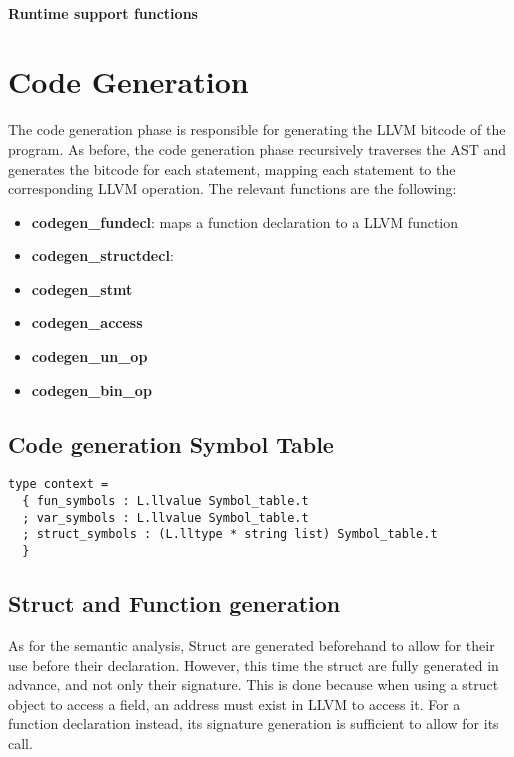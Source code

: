 \documentclass{article}
\begin{document}
\paragraph*{Runtime support functions}


\section{Code Generation}
The code generation phase is responsible for generating the LLVM bitcode of the program.
As before, the code generation phase recursively traverses the AST and generates the bitcode for each statement, mapping
each statement to the corresponding LLVM operation.
The relevant functions are the following:
\begin{itemize}
  \item \textbf{codegen\_fundecl}: maps a function declaration to a LLVM function
  \item \textbf{codegen\_structdecl}:
  \item \textbf{codegen\_stmt}
  \item \textbf{codegen\_access}
  \item \textbf{codegen\_un\_op}
  \item \textbf{codegen\_bin\_op}
\end{itemize}

\subsection*{Code generation Symbol Table}
\begin{lstlisting}
type context =
  { fun_symbols : L.llvalue Symbol_table.t
  ; var_symbols : L.llvalue Symbol_table.t
  ; struct_symbols : (L.lltype * string list) Symbol_table.t
  }
\end{lstlisting}

\subsection*{Struct and Function generation}
As for the semantic analysis, Struct are generated beforehand to allow for their use before their declaration.
However, this time the struct are fully generated in advance, and not only their signature. This is done because
when using a struct object to access a field, an address must exist in LLVM to access it.
For a function declaration instead, its signature generation is sufficient to allow for its call.
\end{document}
